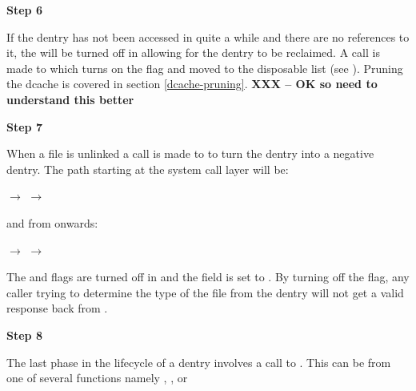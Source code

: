 \vspace{0.25cm}
\noindent
\textbf{Step 6}  %

\vspace{0.25cm}
\noindent
If the dentry has not been accessed in quite a while and there are no references to it, the  will be turned off in  allowing for the dentry to be reclaimed. A call is made to  which turns on the  flag and moved to the disposable list (see ). Pruning the dcache is covered in section \ref{dcache-pruning}. \textbf{XXX -- OK so need to understand this better}

\vspace{0.25cm}
\noindent
\textbf{Step 7}  %

\vspace{0.25cm}
\noindent
When a file is unlinked a call is made to  to turn the dentry into a negative dentry. The path starting at the system call layer will be:

\small
\bigskip 
{} $\rightarrow$  $\rightarrow$ 

    
\bigskip
\normalsize
\noindent
and from  onwards:

\small
\bigskip 
{} $\rightarrow$   $\rightarrow$ 
    
\bigskip
\normalsize
\noindent
The  and  flags are turned off in  and the  field is set to . By turning off the  flag, any caller trying to determine the type of the file from the dentry will not get a valid response back from .

\vspace{0.25cm}
\noindent
\textbf{Step 8}  %

\vspace{0.25cm}
\noindent
The last phase in the lifecycle of a dentry involves a call to . This can be from one of several functions namely , ,  or 


